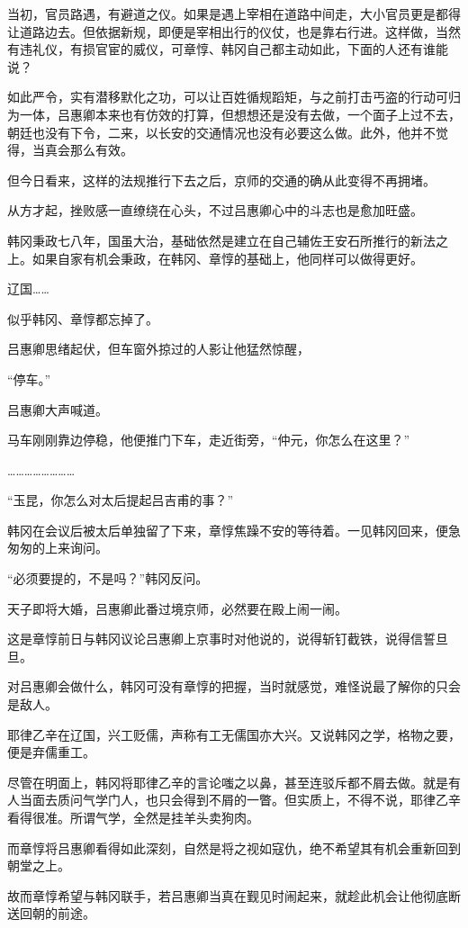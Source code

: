 当初，官员路遇，有避道之仪。如果是遇上宰相在道路中间走，大小官员更是都得让道路边去。但依据新规，即便是宰相出行的仪仗，也是靠右行进。这样做，当然有违礼仪，有损官宦的威仪，可章惇、韩冈自己都主动如此，下面的人还有谁能说？

如此严令，实有潜移默化之功，可以让百姓循规蹈矩，与之前打击丐盗的行动可归为一体，吕惠卿本来也有仿效的打算，但想想还是没有去做，一个面子上过不去，朝廷也没有下令，二来，以长安的交通情况也没有必要这么做。此外，他并不觉得，当真会那么有效。

但今日看来，这样的法规推行下去之后，京师的交通的确从此变得不再拥堵。

从方才起，挫败感一直缭绕在心头，不过吕惠卿心中的斗志也是愈加旺盛。

韩冈秉政七八年，国虽大治，基础依然是建立在自己辅佐王安石所推行的新法之上。如果自家有机会秉政，在韩冈、章惇的基础上，他同样可以做得更好。

辽国……

似乎韩冈、章惇都忘掉了。

吕惠卿思绪起伏，但车窗外掠过的人影让他猛然惊醒，

“停车。”

吕惠卿大声喊道。

马车刚刚靠边停稳，他便推门下车，走近街旁，“仲元，你怎么在这里？”

……………………

“玉昆，你怎么对太后提起吕吉甫的事？”

韩冈在会议后被太后单独留了下来，章惇焦躁不安的等待着。一见韩冈回来，便急匆匆的上来询问。

“必须要提的，不是吗？”韩冈反问。

天子即将大婚，吕惠卿此番过境京师，必然要在殿上闹一闹。

这是章惇前日与韩冈议论吕惠卿上京事时对他说的，说得斩钉截铁，说得信誓旦旦。

对吕惠卿会做什么，韩冈可没有章惇的把握，当时就感觉，难怪说最了解你的只会是敌人。

耶律乙辛在辽国，兴工贬儒，声称有工无儒国亦大兴。又说韩冈之学，格物之要，便是弃儒重工。

尽管在明面上，韩冈将耶律乙辛的言论嗤之以鼻，甚至连驳斥都不屑去做。就是有人当面去质问气学门人，也只会得到不屑的一瞥。但实质上，不得不说，耶律乙辛看得很准。所谓气学，全然是挂羊头卖狗肉。

而章惇将吕惠卿看得如此深刻，自然是将之视如寇仇，绝不希望其有机会重新回到朝堂之上。

故而章惇希望与韩冈联手，若吕惠卿当真在觐见时闹起来，就趁此机会让他彻底断送回朝的前途。

